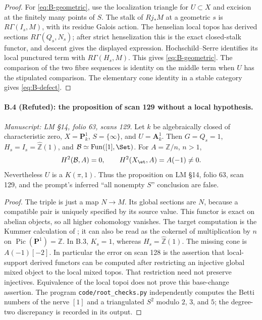 \begin{proof}
For \eqref{eq:B-geometric}, use the localization triangle for $U\subset X$
and excision at the finitely many points of $S$. The stalk of
$Rj_*M$ at a geometric $s$ is $R\Gamma(I_s,M)$, with its residue
Galois action. The henselian local topos has derived sections
$R\Gamma(Q_s,N_s)$; after strict henselization this is the exact
closed-stalk functor, and descent gives the displayed expression.
Hochschild--Serre identifies its local punctured term with
$R\Gamma(H_s,M)$. This gives \eqref{eq:B-geometric}. The comparison
of the two fibre sequences is identity on the middle term when $U$
has the stipulated comparison. The elementary cone identity in a
stable category gives \eqref{eq:B-defect}.
\end{proof}

\paragraph{B.4 (Refuted): the proposition of scan 129 without a local hypothesis.}\label{B4}
\textit{Manuscript: LM \S14, folio 63, scans 129.}
Let $k$ be algebraically closed of characteristic zero,
$X=\mathbf P^1_k$, $S=\{\infty\}$, and $U=\mathbf A^1_k$.
Then $G=Q_s=1$, $H_s=I_s=\widehat{\mathbb Z}(1)$, and
$\mathcal B\simeq\operatorname{Fun}([1],\Set)$. For
$A=\mathbb Z/n$, $n>1$,
\[
 H^2(\mathcal B,A)=0,\qquad
 H^2(X_{\et},A)=A(-1)\ne0.
\]
Nevertheless $U$ is a $K(\pi,1)$. Thus the proposition on LM \S14,
folio 63, scan 129, and the prompt's inferred ``all nonempty $S$''
conclusion are false.

\begin{proof}
The triple is just a map $N\to M$. Its global sections are $N$,
because a compatible pair is uniquely specified by its source value.
This functor is exact on abelian objects, so all higher cohomology
vanishes. The target computation is the Kummer calculation of
\citep[Tag 03RQ, Lemma 59.69.1]{StacksCurveKummer}; it can also be read
as the cokernel of multiplication by $n$ on
$\operatorname{Pic}(\mathbf P^1)=\mathbb Z$.
In B.3, $K_s=1$, whereas $H_s=\widehat{\mathbb Z}(1)$.
The missing cone is $A(-1)[-2]$. In particular the error on scan 128
is the assertion that local-support derived functors can be computed
after restricting an injective global mixed object to the local mixed
topos. That restriction need not preserve injectives. Equivalence of
the local topoi does not prove this base-change assertion.
The program \texttt{code/root\_checks.py} independently computes the
Betti numbers of the nerve $[1]$ and a triangulated $S^2$ modulo
$2$, $3$, and $5$; the degree-two discrepancy is recorded in its output.
\end{proof}

